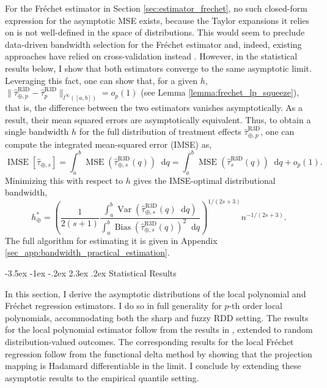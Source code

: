 \documentclass[12pt]{article}
\makeatletter
\renewcommand\section{\@startsection{section}{1}{\z@}%
  {-3.5ex \@plus -1ex \@minus -.2ex}%
  {2.3ex \@plus.2ex}%
  {\bfseries\large\center}} %
\newcommand*\dd{\mathop{}\!\mathrm{d}}
\makeatother
\begin{document}
For the Fr\'echet estimator in Section \ref{sec:estimator_frechet}, no such closed-form expression for the asymptotic MSE exists, because the Taylor expansions it relies on is not well-defined in the space of distributions. This would seem to preclude data-driven bandwidth selection for the Fr\'echet estimator and, indeed, existing approaches have relied on cross-validation instead \citep{petersen2019frechet}. However, in the statistical results below, I show that both estimators converge to the same asymptotic limit. Leveraging this fact, one can show that, for a given $h$, $\| \hat{\tau}_{\oplus, p}^{\mathrm{R3D}} - \hat{\tau}_{p}^{\mathrm{R3D}} \|_{l^\infty([a,b])} = o_p(1)$ (see Lemma \ref{lemma:frechet_lp_squeeze}), that is, the difference between the two estimators vanishes asymptotically. As a result, their mean squared errors are asymptotically equivalent. Thus, to obtain a single bandwidth $h$ for the full distribution of treatment effects $\hat{\tau}_{\oplus, p}^{\mathrm{R3D}}$, one can compute the integrated mean-squared error (IMSE) as,
\[
\operatorname{IMSE}\left[\hat{\tau}_{\oplus, s}\right]=\int_a^b\operatorname{MSE}\left(\hat{\tau}^{\mathrm{R3D}}_{\oplus, s}(q)\right) \dd q = \int_a^b \operatorname{MSE}\left(\hat{\tau}^{\mathrm{R3D}}_s(q)\right)\dd q + o_p(1).
\]
Minimizing this with respect to $h$ gives the IMSE-optimal distributional bandwidth, 
\[
  h_{\oplus}^*
  =
\left(\frac{1}{2(s+1)} \frac{\int_a^b \operatorname{Var}(\hat{\tau}_{\oplus, s}^{\mathrm{R3D}}(q) \dd q)}{\int_a^b \operatorname{Bias}(\hat{\tau}_{\oplus, s}^{\mathrm{R3D}}(q))^2 \dd q}\right)^{1 /(2 s+3)} n^{-1 /(2 s+3)}.
\]
The full algorithm for estimating it is given in Appendix \ref{sec_app:bandwidth_practical_estimation}. 





\section{Statistical Results} \label{sec:statistics}

In this section, I derive the asymptotic distributions of the local polynomial and Fr\'echet regression estimators. I do so in full generality for $p$-th order local polynomials, accommodating both the sharp and fuzzy RDD setting. The results for the local polynomial estimator follow from the results in \citet{chiang2019robust}, extended to random distribution-valued outcomes. The corresponding results for the local Fréchet regression follow from the functional delta method by showing that the projection mapping is Hadamard differentiable in the limit. I conclude by extending these asymptotic results to the empirical quantile setting.
\end{document}
